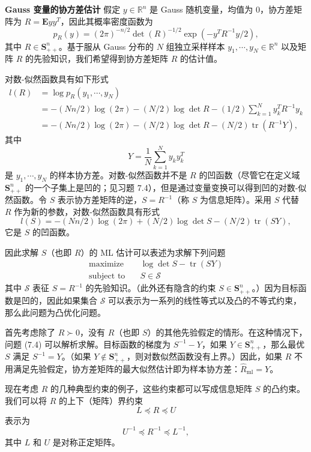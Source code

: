 \documentclass[UTF8, 12pt, fontset=fandol, oneside]{ctexart}
\begin{document}
\noindent\textbf{Gauss 变量的协方差估计}\quad
假定 $y\in\mathbb{R}^n$ 是 Gauss 随机变量，均值为 $0$，协方差矩阵为 $R=\mathbf{E}yy^T$，因此其概率密度函数为
\[
p_R(y)=(2\pi)^{-n/2}\det(R)^{-1/2}\exp(-y^T R^{-1}y/2),
\]
其中 $R\in\mathbf{S}_{++}^n$。基于服从 Gauss 分布的 $N$ 组独立采样样本 $y_1,\cdots,y_N\in\mathbb{R}^n$ 以及矩阵 $R$ 的先验知识，我们希望得到协方差矩阵 $R$ 的估计值。

对数-似然函数具有如下形式
\[
\begin{aligned}
l(R)
&=\log p_R(y_1,\cdots,y_N)\\
&=-(Nn/2)\log(2\pi)-(N/2)\log\det R-(1/2)\sum_{k=1}^N y_k^T R^{-1}y_k\\
&=-(Nn/2)\log(2\pi)-(N/2)\log\det R-(N/2)\operatorname{tr}(R^{-1}Y),
\end{aligned}
\]
其中
\[
Y=\frac{1}{N}\sum_{k=1}^N y_ky_k^T
\]
是 $y_1,\cdots,y_N$ 的样本协方差。对数-似然函数并不是 $R$ 的凹函数（尽管它在定义域 $\mathbf{S}_{++}^n$ 的一个子集上是凹的；见习题 7.4），但是通过变量变换可以得到凹的对数-似然函数。令 $S$ 表示协方差矩阵的逆，$S=R^{-1}$（称 $S$ 为信息矩阵）。采用 $S$ 代替 $R$ 作为新的参数，对数-似然函数具有形式
\[
l(S)=-(Nn/2)\log(2\pi)+(N/2)\log\det S-(N/2)\operatorname{tr}(SY),
\]
它是 $S$ 的凹函数。

因此求解 $S$（也即 $R$）的 ML 估计可以表述为求解下列问题
\begin{equation}
\begin{aligned}
\text{maximize}\quad & \log\det S-\operatorname{tr}(SY)\\
\text{subject to}\quad & S\in\mathcal{S}
\end{aligned}
\tag{7.4}
\end{equation}
其中 $\mathcal{S}$ 表征 $S=R^{-1}$ 的先验知识。（此外还有隐含的约束 $S\in\mathbf{S}_{++}^n$。）因为目标函数是凹的，因此如果集合 $\mathcal{S}$ 可以表示为一系列的线性等式以及凸的不等式约束，那么此问题为凸优化问题。

首先考虑除了 $R\succ 0$，没有 $R$（也即 $S$）的其他先验假定的情形。在这种情况下，问题 (7.4) 可以解析求解。目标函数的梯度为 $S^{-1}-Y$，如果 $Y\in\mathbf{S}_{++}^n$，那么最优 $S$ 满足 $S^{-1}=Y$。（如果 $Y\notin\mathbf{S}_{++}^n$，则对数似然函数没有上界。）因此，如果 $R$ 不用满足先验假定，协方差矩阵的最大似然估计即为样本协方差：$\hat{R}_{\mathrm{ml}}=Y$。

现在考虑 $R$ 的几种典型约束的例子，这些约束都可以写成信息矩阵 $S$ 的凸约束。我们可以将 $R$ 的上下（矩阵）界约束
\[
L\preceq R\preceq U
\]
表示为
\[
U^{-1}\preceq R^{-1}\preceq L^{-1},
\]
其中 $L$ 和 $U$ 是对称正定矩阵。
\end{document}
